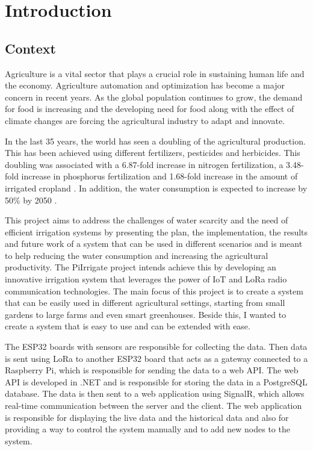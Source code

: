 \chapter{Introduction}\label{section:introduction}
\thispagestyle{pagestyle}


\section{Context}

Agriculture is a vital sector that plays a crucial role in sustaining human life and the economy.
Agriculture automation and optimization has become a major concern in recent years. 
As the global population continues to grow, the demand for food is increasing and the developing need for food
along with the effect of climate changes are forcing the agricultural industry to adapt and innovate\cite{OBAIDEEN2022100124}.

In the last 35 years, the world has seen a doubling of the agricultural production. This has been achieved using 
different fertilizers, pesticides and herbicides. This doubling was associated with a 6.87-fold increase in nitrogen fertilization,
a 3.48-fold increase in phosphorus fertilization and 1.68-fold increase in the amount of irrigated cropland \cite{doi:10.1073/pnas.96.11.5995}.
In addition, the water consumption is expected to increase by 50\% by 2050 \cite{s20236865}. 

This project aims to address the challenges of water scarcity and the need of efficient irrigation systems
by presenting the plan, the implementation, the results and future work of a system that can be used in different
scenarios and is meant to help reducing the water consumption and increasing the agricultural productivity.
The PiIrrigate project intends achieve this by developing an innovative irrigation system that leverages the power of 
IoT and LoRa radio communication technologies.  
The main focus of this project is to create a system that can be easily used in different agricultural settings, 
starting from small gardens to large farms and even smart greenhouses. Beside this, I wanted to create a system that 
is easy to use and can be extended with ease. 

The ESP32 boards with sensors are responsible for collecting the data. Then data is sent using  LoRa to another
ESP32 board that acts as a gateway connected to a Raspberry Pi, which is responsible for sending the data to a web API.
The web API is developed in .NET and is responsible for storing the data in a PostgreSQL database.
The data is then sent to a web application using SignalR, which allows real-time communication between the server and the client.
The web application is responsible for displaying the live data and the historical data and also for providing a way to
control the system manually and to add new nodes to the system. 

